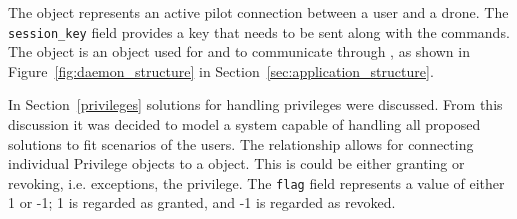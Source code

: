 The  object represents an active pilot connection between a user and a drone.
The \verb+session_key+ field provides a key that needs to be sent along with the commands.
The  object is an object used for  and  to communicate through , as shown in Figure~\ref{fig:daemon_structure} in Section~\ref{sec:application_structure}.

In Section~\ref{privileges} solutions for handling privileges were discussed.
From this discussion it was decided to model a system capable of handling all proposed solutions to fit scenarios of the users.
The  relationship allows for connecting individual {Privilege} objects to a  object.
This is could be either granting or revoking, i.e. exceptions, the privilege.
The \verb+flag+ field represents a value of either 1 or -1; 1 is regarded as granted, and -1 is regarded as revoked.







